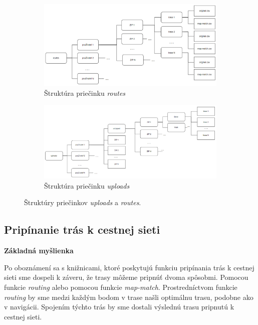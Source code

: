 \begin{figure}[H]
    \centering
    \begin{subfigure}{\textwidth}
        \centering
        \includegraphics[width=1\textwidth]{img/struktura priecinkov/routes.png}
        \caption{Štruktúra priečinku \textit{routes}}
        \label{fig:routes-structure}
    \end{subfigure}
    \begin{subfigure}{\textwidth}
        \centering
        \includegraphics[width=1\textwidth]{img/struktura priecinkov/uploads.png}
        \caption{Štruktúra priečinku \textit{uploads}}
        \label{fig:uploads-structure}
    \end{subfigure}
    \caption{Štruktúry priečinkov \textit{uploads} a \textit{routes}.}
    \label{fig:uploads-routes-structure}
\end{figure}


\subsection{Pripínanie trás k cestnej sieti}
\textbf{Základná myšlienka}

Po oboznámení sa s knižnicami, ktoré poskytujú funkciu pripínania trás k cestnej sieti sme dospeli k záveru, že trasy môžeme pripnúť dvoma spôsobmi. Pomocou funkcie \textit{routing} alebo pomocou funkcie \textit{map-match}. Prostredníctvom funkcie \textit{routing} by sme medzi každým bodom v trase našli optimálnu trasu, podobne ako v navigácii. Spojením týchto trás by sme dostali výslednú trasu pripnutú k cestnej sieti.

